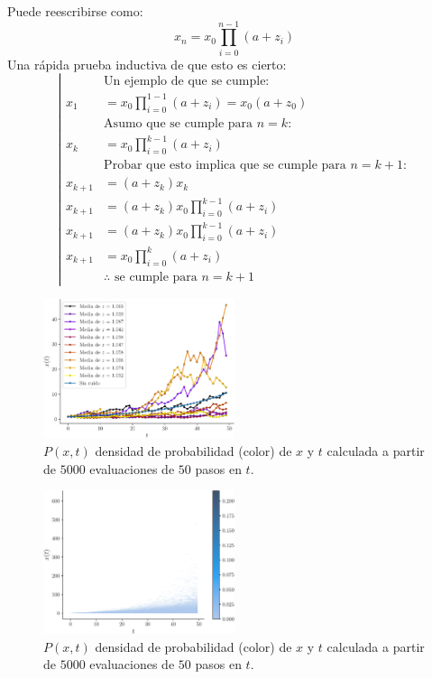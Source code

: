 \documentclass[twocolumn,aps,prl]{revtex4-1}
\newcommand{\nSimulacionesB}{5000}
\newcommand{\Nsteps}{50}
\begin{document}
Puede reescribirse como:
\begin{equation}\label{ec:map02-r}
  x_n = x_0 \prod_{i=0}^{n-1} (a + z_i)
\end{equation}
Una rápida prueba inductiva de que esto es cierto:
$$
\left|
\begin{aligned}
  & \text{Un ejemplo de que se cumple:} \\
  x_1 &= x_0 \prod_{i=0}^{1-1} (a + z_i) = x_0 (a + z_0)\\
  & \text{Asumo que se cumple para $n=k$:} \\
  x_k &= x_0 \prod_{i=0}^{k-1} (a + z_i)\\
  & \text{Probar que esto implica que se cumple para $n=k+1$:} \\
  x_{k+1} &= (a + z_k) x_k \\
  x_{k+1} &= (a + z_k) x_0 \prod_{i=0}^{k-1} (a + z_i) \\
  x_{k+1} &= (a + z_k) x_0 \prod_{i=0}^{k-1} (a + z_i) \\
  x_{k+1} &= x_0 \prod_{i=0}^{k} (a + z_i) \\
  & \text{$\therefore$ se cumple para $n=k+1$}
\end{aligned}
\right.
$$


\begin{figure}[!ht]  
  \centering  
  \includegraphics[width=0.5\textwidth]{figuras/ex02-mapeo-02.pdf}
  \caption{$P(x,t)$ densidad de probabilidad (color) de $x$ y $t$ calculada a partir de $\nSimulacionesB$ evaluaciones de $\Nsteps$ pasos en $t$.}
  \label{fig:ex02-mapeo}
\end{figure}

\begin{figure}[!ht]  
  \centering  
  \includegraphics[width=0.5\textwidth]{figuras/ex02-histograma-02.pdf}
  \caption{$P(x,t)$ densidad de probabilidad (color) de $x$ y $t$ calculada a partir de $\nSimulacionesB$ evaluaciones de $\Nsteps$ pasos en $t$.}
  \label{fig:ex02-histograma}
\end{figure}
\end{document}
